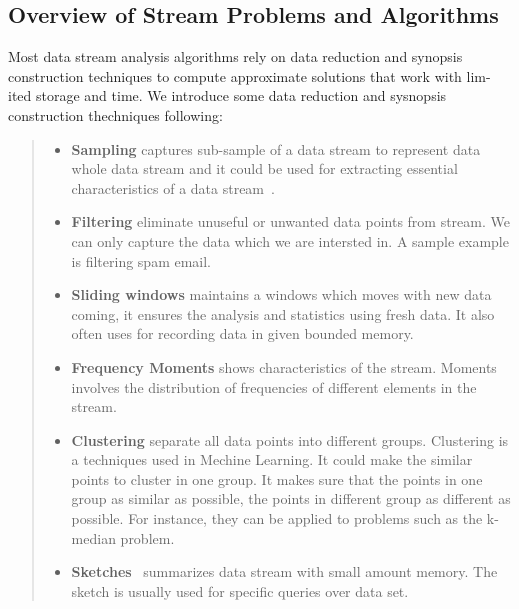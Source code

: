 \subsection{Overview of Stream Problems and Algorithms}
Most data stream analysis algorithms rely on data reduction and synopsis
construction techniques to compute approximate solutions that work with lim-ited
storage and time. We introduce some data reduction and sysnopsis construction
thechniques following:
\begin{quote}
\begin{itemize}
    \item  \textbf{Sampling} captures sub-sample of a data stream to represent
    data whole data stream and it could be used for extracting essential
    characteristics of a data stream~\cite{kejariwal2015real}.
    
    \item \textbf{Filtering} eliminate unuseful or unwanted data points from
    stream. We can only capture the data which we are intersted in. A sample
    example is filtering spam email.
    
    \item \textbf{Sliding windows} maintains a windows which moves with new data
    coming, it ensures the analysis and statistics using fresh data. It also 
    often uses for recording data in given bounded memory.

    \item \textbf{Frequency Moments} shows characteristics of the stream.
    Moments involves the distribution of frequencies of different elements in
    the stream. 
    
    
    \item \textbf{Clustering} separate all data points into different groups.
    Clustering is a techniques used in Mechine Learning. It could make the 
    similar points to cluster in one group. It makes sure that the points in one
    group as similar as possible, the points in different group as different as
    possible. For instance, they can be applied to problems such as the k-median 
    problem. 
    
    \item \textbf{Sketches}~\cite{alon1999space} summarizes data stream with 
    small amount memory. The sketch is usually used for specific queries over 
    data set.~\cite{kejariwal2015real}

\begin{comment}
    \item \textbf{Histograms} approximate the distribution of a set of values
    $v_1, ..., v_n$ by a piecewise constant function $\hat{v}(i),$ so as to
    minimize the sum of squared error. Equi-width histograms partition the
    domain into buckets such that the number of $v_i$ values falling into each
    bucket is uniform across all buckets. End-biased histograms maintain exact
    counts of items that occur with frequency above a threshold, and approximate
    the other counts by a uniform distribution~\cite{kejariwal2015real}.
    

\end{comment}
\end{itemize}
\end{quote}
